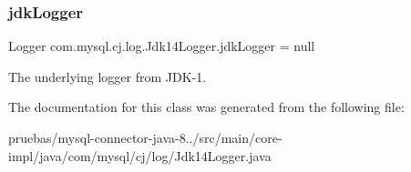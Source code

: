 \subsubsection{\texorpdfstring{jdk\+Logger}{jdkLogger}}
{\footnotesize\ttfamily Logger com.\+mysql.\+cj.\+log.\+Jdk14\+Logger.\+jdk\+Logger = null\hspace{0.3cm}{\ttfamily [protected]}}

The underlying logger from J\+D\+K-\/1. 

The documentation for this class was generated from the following file\+:\begin{DoxyCompactItemize}
\item 
pruebas/mysql-\/connector-\/java-\/8../src/main/core-\/impl/java/com/mysql/cj/log/Jdk14\+Logger.\+java\end{DoxyCompactItemize}
